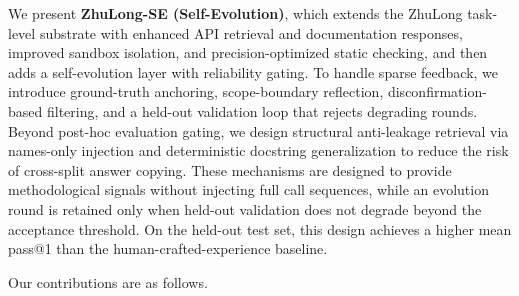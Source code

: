 We present \textbf{ZhuLong-SE (Self-Evolution)}, which extends the ZhuLong task-level substrate with enhanced API retrieval and documentation responses, improved sandbox isolation, and precision-optimized static checking, and then adds a self-evolution layer with reliability gating. To handle sparse feedback, we introduce ground-truth anchoring, scope-boundary reflection, disconfirmation-based filtering, and a held-out validation loop that rejects degrading rounds. Beyond post-hoc evaluation gating, we design structural anti-leakage retrieval via names-only injection and deterministic docstring generalization to reduce the risk of cross-split answer copying. These mechanisms are designed to provide methodological signals without injecting full call sequences, while an evolution round is retained only when held-out validation does not degrade beyond the acceptance threshold. On the held-out test set, this design achieves a higher mean pass@1 than the human-crafted-experience baseline.

Our contributions are as follows.

